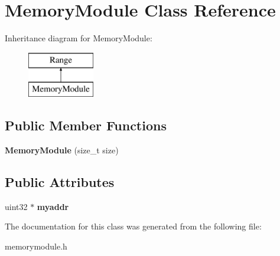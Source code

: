 \hypertarget{classMemoryModule}{
\section{MemoryModule Class Reference}
\label{classMemoryModule}
}
Inheritance diagram for MemoryModule:\begin{figure}[H]
\begin{center}
\leavevmode
\includegraphics[height=2cm]{classMemoryModule}
\end{center}
\end{figure}
\subsection*{Public Member Functions}
\begin{DoxyCompactItemize}
\item 
\hypertarget{classMemoryModule_a6d75820f2b0187421938e5a54d016c81}{
{\bfseries MemoryModule} (size\_\-t size)}
\label{classMemoryModule_a6d75820f2b0187421938e5a54d016c81}

\end{DoxyCompactItemize}
\subsection*{Public Attributes}
\begin{DoxyCompactItemize}
\item 
\hypertarget{classMemoryModule_a61b35d32fd4ca055aa41d7665baa3c87}{
uint32 $\ast$ {\bfseries myaddr}}
\label{classMemoryModule_a61b35d32fd4ca055aa41d7665baa3c87}

\end{DoxyCompactItemize}


The documentation for this class was generated from the following file:\begin{DoxyCompactItemize}
\item 
memorymodule.h\end{DoxyCompactItemize}
